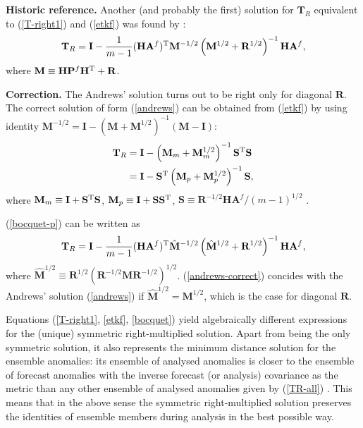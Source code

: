 \documentclass[11pt]{report}
\newcommand{\mb} {\mathbf}
\newcommand{\T}{^{\tiny \mathrm T}}
\begin{document}
{
  \scriptsize
  {\bf Historic reference.} Another (and probably the first) solution for $\mb T_R$ equivalent to (\ref{T-right1}) and (\ref{etkf}) was found by \citet{and68a}:
  \setlength{\abovedisplayskip}{1pt}
  \setlength{\belowdisplayskip}{3pt}
  \begin{align}
    \label{andrews}
    \mb T_R = \mb I - \frac{1}{m-1} (\mb H \mb A^f)\T \mb M^{-1/2} \left(\mb M^{1/2} + \mb R^{1/2}\right)^{-1} \mb H \mb A^f,
  \end{align}
  where $\mb M \equiv \mb H \mb P^f \mb H\T + \mb R$.
}

{
  \scriptsize
  {\bf Correction.} The Andrews' solution turns out to be right only for diagonal $\mb R$.
  The correct solution of form (\ref{andrews}) can be obtained from (\ref{etkf}) by using identity $\mb M^{-1/2} = \mb I - (\mb M + \mb M^{1/2})^{-1}(\mb M - \mb I)$:
  \setlength{\abovedisplayskip}{1pt}
  \setlength{\belowdisplayskip}{3pt}
  \begin{subequations}
    \label{bocquet}
    \begin{align}
      \mb T_R &= \mb I - \left(\mb M_m + \mb M_m^{1/2}\right)^{-1} \mb S\T \mb S\\
      \label{bocquet-p}
      &= \mb I - \mb S\T \left(\mb M_p + \mb M_p^{1/2}\right)^{-1} \mb S,
    \end{align}
 \end{subequations}
  where $\mb M_m \equiv \mb I + \mb S\T \mb S$, $\mb M_p \equiv \mb I + \mb S \mb S\T$, $\mb S \equiv \mb R^{-1/2} \mb H \mb A^f / (m - 1)^{1/2}$ \citep{boc16a}.

  (\ref{bocquet-p}) can be written as
  \begin{align}
    \label{andrews-correct}
    \mb T_R = \mb I - \frac{1}{m-1} (\mb H \mb A^f)\T \hat{\mb M}^{-1/2} \left(\hat{\mb M}^{1/2} + \mb R^{1/2}\right)^{-1} \mb H \mb A^f,
  \end{align}
  where $\hat{\mb M}^{1/2} \equiv \mb R^{1/2} (\mb R^{-1/2} \mb M \mb R^{-1/2})^{1/2}$.
(\ref{andrews-correct}) concides with the Andrews' solution (\ref{andrews}) if $\hat{\mb M}^{1/2} = \mb M^{1/2}$, which is the case for diagonal $\mb R$.
}

Equations (\ref{T-right1}, \ref{etkf}, \ref{bocquet}) yield algebraically different expressions for the (unique) symmetric right-multiplied solution.
Apart from being the only symmetric solution, it also represents the minimum distance solution for the ensemble anomalies: its ensemble of analysed anomalies is closer to the ensemble of forecast anomalies with the inverse forecast (or analysis) covariance as the metric than any other ensemble of analysed anomalies given by (\ref{TR-all}) \citep{ott03a}.
This means that in the above sense the symmetric right-multiplied solution preserves the identities of ensemble members during analysis in the best possible way.
\end{document}
